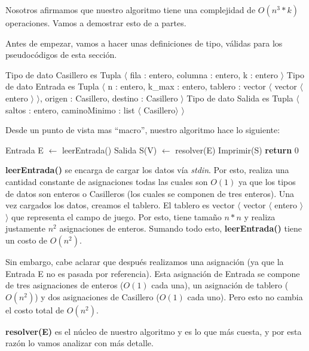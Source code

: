 Nosotros afirmamos que nuestro algoritmo tiene una complejidad de $O(n^3 * k)$ operaciones. Vamos a demostrar esto de a partes.

Antes de empezar, vamos a hacer unas definiciones de tipo, válidas para los pseudocódigos de esta sección.
\begin{pseudo}
\State Tipo de dato Casillero es Tupla $\langle$ fila : entero, columna : entero, k : entero $\rangle$
\State Tipo de dato Entrada es Tupla $\langle$ n : entero, k\_max : entero, tablero : vector $\langle$ vector $\langle$ entero $\rangle$ $\rangle$, origen : Casillero, destino : Casillero $\rangle$
\State Tipo de dato Salida es Tupla $\langle$ saltos : entero, caminoMinimo : list $\langle$ Casillero$\rangle$ $\rangle$
\end{pseudo}

Desde un punto de vista mas ``macro'', nuestro algoritmo hace lo siguiente:

\begin{pseudo}
        \State Entrada E $\leftarrow$ leerEntrada() 
        \State Salida S(V) $\leftarrow$ resolver(E) 
        \State Imprimir(S) 
        \State \textbf{return} 0
    \EndProcedure
\end{pseudo}

\textbf{leerEntrada()} se encarga de cargar los datos vía \emph{stdin}. Por esto, realiza una cantidad constante de asignaciones todas las cuales son $O(1)$ ya que los tipos de datos son enteros o Casilleros (los cuales se componen de tres enteros). Una vez cargados los datos, creamos el tablero. El tablero es vector $\langle$ vector $\langle$ entero $\rangle$ $\rangle$ que representa el campo de juego. Por esto, tiene tamaño $n*n$ y realiza justamente $n^2$ asignaciones de enteros. Sumando todo esto, \textbf{leerEntrada()} tiene un costo de $O(n^2)$.

Sin embargo, cabe aclarar que después realizamos una asignación (ya que la Entrada E no es pasada por referencia). Esta asignación de Entrada se compone de tres asignaciones de enteros ($O(1)$ cada una), un asignación de tablero ($O(n^2)$) y dos asignaciones de Casillero ($O(1)$ cada uno). Pero esto no cambia el costo total de $O(n^2)$.

\textbf{resolver(E)} es el núcleo de nuestro algoritmo y es lo que más cuesta, y por esta razón lo vamos analizar con más detalle.

